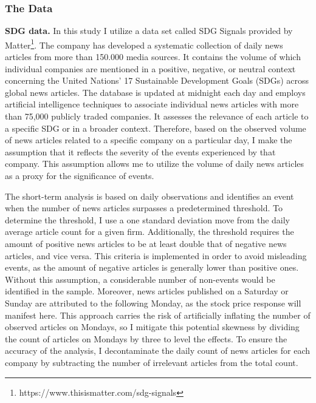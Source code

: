 \subsubsection{The Data}

\textbf{SDG data.} In this study I utilize a data set called SDG Signals provided by Matter\footnote{ https://www.thisismatter.com/sdg-signals}. The company has developed a systematic collection of daily news articles from more than 150.000 media sources. It contains the volume of which individual companies are mentioned in a positive, negative, or neutral context concerning the United Nations' 17 Sustainable Development Goals (SDGs) across global news articles. The database is updated at midnight each day and employs artificial intelligence techniques to associate individual news articles with more than 75,000 publicly traded companies. It assesses the relevance of each article to a specific SDG or in a broader context. Therefore, based on the observed volume of news articles related to a specific company on a particular day, I make the assumption that it reflects the severity of the events experienced by that company. This assumption allows me to utilize the volume of daily news articles as a proxy for the significance of events.

The short-term analysis is based on daily observations and identifies an event when the number of news articles surpasses a predetermined threshold. To determine the threshold, I use a one standard deviation move from the daily average article count for a given firm. Additionally, the threshold requires the amount of positive news articles to be at least double  that of negative news articles, and vice versa. This criteria is implemented in order to avoid misleading events, as the amount of negative articles is generally lower than positive ones. Without this assumption, a considerable number of non-events would be identified in the sample. Moreover, news articles published on a Saturday or Sunday are attributed to the following Monday, as the stock price response will manifest here. This approach carries the risk of artificially inflating the number of observed articles on Mondays, so I mitigate this potential skewness by dividing the count of articles on Mondays by three to level the effects. To ensure the accuracy of the analysis, I decontaminate the daily count of news articles for each company by subtracting the number of irrelevant articles from the total count. 

